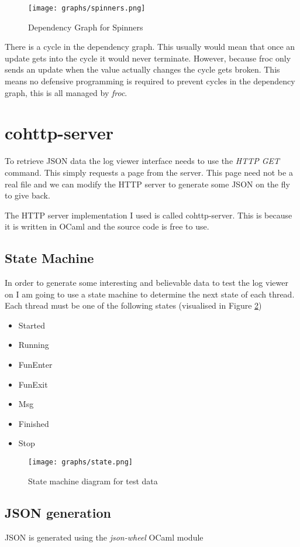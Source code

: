 \begin{figure}
  \centering
  \texttt{[image: graphs/spinners.png]}
  \caption{Dependency Graph for Spinners}
  \label{spinners}
\end{figure}

There is a cycle in the dependency graph. This usually would mean that once an update gets into the cycle it would never terminate. However, because froc only sends an update when the value actually changes the cycle gets broken. This means no defensive programming is required to prevent cycles in the dependency graph, this is all managed by \emph{froc}.

\section{cohttp-server}
To retrieve JSON data the log viewer interface needs to use the \emph{HTTP GET} command. This simply requests a page from the server. This page need not be a real file and we can modify the HTTP server to generate some JSON on the fly to give back.

The HTTP server implementation I used is called cohttp-server. This is because it is written in OCaml and the source code is free to use.

\subsection{State Machine}
In order to generate some interesting and believable data to test the log viewer on I am going to use a state machine to determine the next state of each thread. Each thread must be one of the following states (visualised in Figure \ref{state})
\begin{itemize}{}
\item Started
\item Running
\item FunEnter
\item FunExit
\item Msg
\item Finished
\item Stop
\end{itemize}

\begin{figure}
  \centering
  \texttt{[image: graphs/state.png]}
  \caption{State machine diagram for test data}
  \label{state}
\end{figure}

\subsection{JSON generation}
JSON is generated using the \emph{json-wheel} OCaml module

